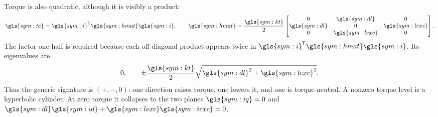 Torque is also quadratic, although it is visibly a product:
\begin{equation}
 \gls{sym:te}=\gls{sym:i}^{\mathsf T}\gls{sym:hmat}\gls{sym:i},\qquad
 \gls{sym:hmat}=\frac{\gls{sym:kt}}2
 \begin{bmatrix}
 0&\gls{sym:dl}&0\\
 \gls{sym:dl}&0&\gls{sym:lexc}\\
 0&\gls{sym:lexc}&0
 \end{bmatrix}.
 \label{eq:H-matrix}
\end{equation}
The factor one half is required because each off-diagonal product appears
twice in \(\gls{sym:i}^{\mathsf T}\gls{sym:hmat}\gls{sym:i}\). Its eigenvalues
are
\begin{equation}
 0,\qquad \pm\frac{\gls{sym:kt}}2
 \sqrt{\gls{sym:dl}^{2}+\gls{sym:lexc}^{2}}.
 \label{eq:H-eigenvalues}
\end{equation}
Thus the generic signature is \((+,-,0)\): one direction raises torque, one
lowers it, and one is torque-neutral. A nonzero torque level is a hyperbolic
cylinder. At zero torque it collapses to the two planes
\(\gls{sym:iq}=0\) and
\(\gls{sym:dl}\gls{sym:id}+\gls{sym:lexc}\gls{sym:iexc}=0\).

